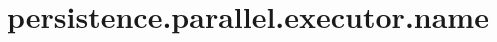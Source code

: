 \section{persistence.parallel.executor.name}
\label{configuration:PersistenceParallelExecutorName}
\AvailableInJavaOnly{\TODO}